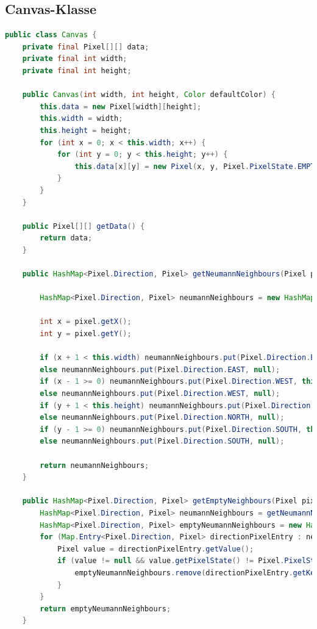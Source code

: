 \documentclass[a4paper,10pt,ngerman]{scrartcl}
\begin{document}
\subsection{Canvas-Klasse}
\begin{lstlisting}[language=Java]
public class Canvas {
    private final Pixel[][] data;
    private final int width;
    private final int height;

    public Canvas(int width, int height, Color defaultColor) {
        this.data = new Pixel[width][height];
        this.width = width;
        this.height = height;
        for (int x = 0; x < this.width; x++) {
            for (int y = 0; y < this.height; y++) {
                this.data[x][y] = new Pixel(x, y, Pixel.PixelState.EMPTY, defaultColor);
            }
        }
    }

    public Pixel[][] getData() {
        return data;
    }

    public HashMap<Pixel.Direction, Pixel> getNeumannNeighbours(Pixel pixel) {

        HashMap<Pixel.Direction, Pixel> neumannNeighbours = new HashMap<>();

        int x = pixel.getX();
        int y = pixel.getY();

        if (x + 1 < this.width) neumannNeighbours.put(Pixel.Direction.EAST, this.data[x + 1][y]);
        else neumannNeighbours.put(Pixel.Direction.EAST, null);
        if (x - 1 >= 0) neumannNeighbours.put(Pixel.Direction.WEST, this.data[x - 1][y]);
        else neumannNeighbours.put(Pixel.Direction.WEST, null);
        if (y + 1 < this.height) neumannNeighbours.put(Pixel.Direction.NORTH, this.data[x][y + 1]);
        else neumannNeighbours.put(Pixel.Direction.NORTH, null);
        if (y - 1 >= 0) neumannNeighbours.put(Pixel.Direction.SOUTH, this.data[x][y - 1]);
        else neumannNeighbours.put(Pixel.Direction.SOUTH, null);

        return neumannNeighbours;
    }

    public HashMap<Pixel.Direction, Pixel> getEmptyNeighbours(Pixel pixel) {
        HashMap<Pixel.Direction, Pixel> neumannNeighbours = getNeumannNeighbours(pixel);
        HashMap<Pixel.Direction, Pixel> emptyNeumannNeighbours = new HashMap<>(neumannNeighbours);
        for (Map.Entry<Pixel.Direction, Pixel> directionPixelEntry : neumannNeighbours.entrySet()) {
            Pixel value = directionPixelEntry.getValue();
            if (value != null && value.getPixelState() != Pixel.PixelState.EMPTY) {
                emptyNeumannNeighbours.remove(directionPixelEntry.getKey());
            }
        }
        return emptyNeumannNeighbours;
    }


\end{lstlisting}
\end{document}
